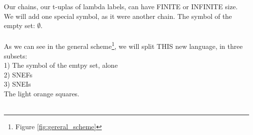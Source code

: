 		\noindent
		Our chains, our t-uplas of lambda labels, can have FINITE or INFINITE size. We will add one special symbol, as it were another chain. The symbol of the empty set: $\emptyset$.
		\\\\
		
		\noindent
		As we can see in the general scheme\footnote{Figure \ref{fig:gereral_scheme}}, we will split THIS new language, in three subsets:\\
		1) The symbol of the emtpy set, alone\\
		2) SNEFs\\
		3) SNEIs\\
		The light orange squares.
		\\\\	
		
\newpage
